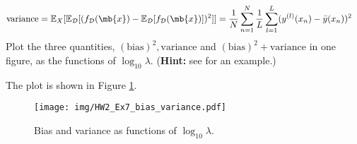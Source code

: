 \begin{exercise}
\begin{enumerate}
\begin{align*}
                \mbox{variance} & = \mathbb{E}_X[\mathbb{E}_{\mathcal{D}}[(f_{\mathcal{D}}(\mb{x})-\mathbb{E}_{\mathcal{D}}[f_{\mathcal{D}}(\mb{x})])^2]] = \frac{1}{N}\sum_{n=1}^N\frac{1}{L}\sum_{l=1}^L (y^{(l)}(x_n)-\bar{y}(x_n))^2
            \end{align*}
            Plot the three quantities, $(\mbox{bias})^2, \mbox{variance}$ and $(\mbox{bias})^2 + \mbox{variance}$ in one figure, as the functions of $\log_{10}\lambda$.
            (\textbf{Hint:} see \cite{Bishop2006} for an example.)
            \begin{solution}
                The plot is shown in Figure \ref{fig:variance-lambda}.
                \qedhere
                \begin{figure}[H]
                    \centering
                    \texttt{[image: img/HW2\_Ex7\_bias\_variance.pdf]}
                    \caption{Bias and variance as functions of $\log_{10}\lambda$.}
                    \label{fig:variance-lambda}
                \end{figure}
            \end{solution}
    \end{enumerate}
    
\end{exercise}
\newpage




